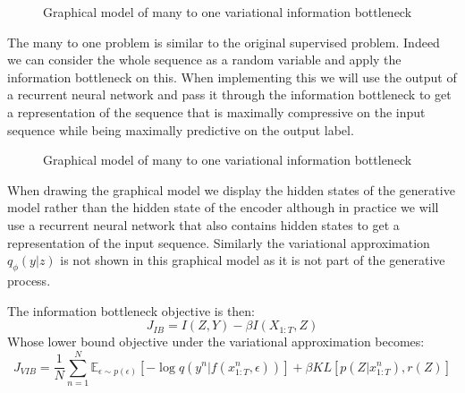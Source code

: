 \documentclass[11pt,oneside,openright]{report}
\begin{document}
\begin{figure}[H]
\centering
{}
\caption{Graphical model of many to one variational information bottleneck}
\end{figure}

The many to one problem is similar to the original supervised problem. Indeed we can consider the whole sequence as a random variable and apply the information bottleneck on this. When implementing this we will use the output of a recurrent neural network and pass it through the information bottleneck to get a representation of the sequence that is maximally compressive on the input sequence while being maximally predictive on the output label.

\begin{figure}[H]
\centering
{}
\caption{Graphical model of many to one variational information bottleneck }
\end{figure}

When drawing the graphical model we display the hidden states of the generative model rather than the hidden state of the encoder although in practice we will use a recurrent neural network that also contains hidden states to get a representation of the input sequence. Similarly the variational approximation $q_\phi(y|z)$ is not shown in this graphical model as it is not part of the generative process.

The information bottleneck objective is then:
$$ J_{IB} = I(Z, Y) - \beta I(X_{1:T}, Z)$$
Whose lower bound objective under the variational approximation becomes:
 $$ J_{VIB} = \frac{1}{N}  \sum_{n=1}^{N} \mathbb{E}_{\epsilon \sim p(\epsilon)}[- \log q(y^{n} |f(x_{1:T}^n, \epsilon))] + \beta KL[p(Z|x_{1:T}^n), r(Z)]$$
\end{document}
